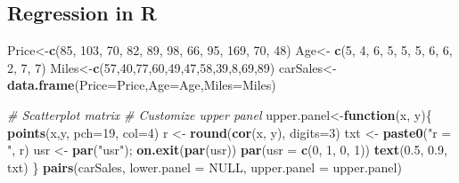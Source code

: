 \documentclass[
]{article}
\newenvironment{Shaded}{\begin{snugshade}}{\end{snugshade}}
\newcommand{\AttributeTok}[1]{\textcolor[rgb]{0.13,0.29,0.53}{#1}}
\newcommand{\CommentTok}[1]{\textcolor[rgb]{0.56,0.35,0.01}{\textit{#1}}}
\newcommand{\ConstantTok}[1]{\textcolor[rgb]{0.56,0.35,0.01}{#1}}
\newcommand{\ControlFlowTok}[1]{\textcolor[rgb]{0.13,0.29,0.53}{\textbf{#1}}}
\newcommand{\DecValTok}[1]{\textcolor[rgb]{0.00,0.00,0.81}{#1}}
\newcommand{\FloatTok}[1]{\textcolor[rgb]{0.00,0.00,0.81}{#1}}
\newcommand{\FunctionTok}[1]{\textcolor[rgb]{0.13,0.29,0.53}{\textbf{#1}}}
\newcommand{\NormalTok}[1]{#1}
\newcommand{\OtherTok}[1]{\textcolor[rgb]{0.56,0.35,0.01}{#1}}
\newcommand{\StringTok}[1]{\textcolor[rgb]{0.31,0.60,0.02}{#1}}
\begin{document}
\hypertarget{regression-in-r}{%
\subsection{Regression in R}\label{regression-in-r}}

\begin{Shaded}
\begin{Highlighting}[]
\NormalTok{Price}\OtherTok{\textless{}{-}}\FunctionTok{c}\NormalTok{(}\DecValTok{85}\NormalTok{, }\DecValTok{103}\NormalTok{,  }\DecValTok{70}\NormalTok{,  }\DecValTok{82}\NormalTok{,  }\DecValTok{89}\NormalTok{,  }\DecValTok{98}\NormalTok{,  }\DecValTok{66}\NormalTok{,  }\DecValTok{95}\NormalTok{, }\DecValTok{169}\NormalTok{,  }\DecValTok{70}\NormalTok{,  }\DecValTok{48}\NormalTok{)}
\NormalTok{Age}\OtherTok{\textless{}{-}} \FunctionTok{c}\NormalTok{(}\DecValTok{5}\NormalTok{, }\DecValTok{4}\NormalTok{, }\DecValTok{6}\NormalTok{, }\DecValTok{5}\NormalTok{, }\DecValTok{5}\NormalTok{, }\DecValTok{5}\NormalTok{, }\DecValTok{6}\NormalTok{, }\DecValTok{6}\NormalTok{, }\DecValTok{2}\NormalTok{, }\DecValTok{7}\NormalTok{, }\DecValTok{7}\NormalTok{)}
\NormalTok{Miles}\OtherTok{\textless{}{-}}\FunctionTok{c}\NormalTok{(}\DecValTok{57}\NormalTok{,}\DecValTok{40}\NormalTok{,}\DecValTok{77}\NormalTok{,}\DecValTok{60}\NormalTok{,}\DecValTok{49}\NormalTok{,}\DecValTok{47}\NormalTok{,}\DecValTok{58}\NormalTok{,}\DecValTok{39}\NormalTok{,}\DecValTok{8}\NormalTok{,}\DecValTok{69}\NormalTok{,}\DecValTok{89}\NormalTok{)}
\NormalTok{carSales}\OtherTok{\textless{}{-}}\FunctionTok{data.frame}\NormalTok{(}\AttributeTok{Price=}\NormalTok{Price,}\AttributeTok{Age=}\NormalTok{Age,}\AttributeTok{Miles=}\NormalTok{Miles)}


\CommentTok{\# Scatterplot matrix}
\CommentTok{\# Customize upper panel}
\NormalTok{upper.panel}\OtherTok{\textless{}{-}}\ControlFlowTok{function}\NormalTok{(x, y)\{}
  \FunctionTok{points}\NormalTok{(x,y, }\AttributeTok{pch=}\DecValTok{19}\NormalTok{, }\AttributeTok{col=}\DecValTok{4}\NormalTok{)}
\NormalTok{  r }\OtherTok{\textless{}{-}} \FunctionTok{round}\NormalTok{(}\FunctionTok{cor}\NormalTok{(x, y), }\AttributeTok{digits=}\DecValTok{3}\NormalTok{)}
\NormalTok{  txt }\OtherTok{\textless{}{-}} \FunctionTok{paste0}\NormalTok{(}\StringTok{"r = "}\NormalTok{, r)}
\NormalTok{  usr }\OtherTok{\textless{}{-}} \FunctionTok{par}\NormalTok{(}\StringTok{"usr"}\NormalTok{); }\FunctionTok{on.exit}\NormalTok{(}\FunctionTok{par}\NormalTok{(usr))}
  \FunctionTok{par}\NormalTok{(}\AttributeTok{usr =} \FunctionTok{c}\NormalTok{(}\DecValTok{0}\NormalTok{, }\DecValTok{1}\NormalTok{, }\DecValTok{0}\NormalTok{, }\DecValTok{1}\NormalTok{))}
  \FunctionTok{text}\NormalTok{(}\FloatTok{0.5}\NormalTok{, }\FloatTok{0.9}\NormalTok{, txt)}
\NormalTok{\}}
\FunctionTok{pairs}\NormalTok{(carSales, }\AttributeTok{lower.panel =} \ConstantTok{NULL}\NormalTok{, }
      \AttributeTok{upper.panel =}\NormalTok{ upper.panel)}
\end{Highlighting}
\end{Shaded}
\end{document}
